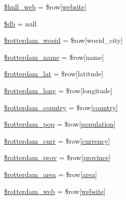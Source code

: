 \begin{DoxyCompactItemize}
\mbox{\hyperlink{index_8php_a5acbf72a3c5ccb817baae0bbb0daf2c8}{\$hull\+\_\+web}} = \$row\mbox{[}\textquotesingle{}\mbox{\hyperlink{index_8php_a8c56014cff17c1ced653aa98455da680}{website}}\textquotesingle{}\mbox{]}
\item 
\mbox{\hyperlink{index_8php_a1fa3127fc82f96b1436d871ef02be319}{\$db}} = null
\item 
\mbox{\hyperlink{index_8php_a7ff0c47a623b98fd9f9e0dee5abbefcd}{\$rotterdam\+\_\+woeid}} = \$row\mbox{[}\textquotesingle{}woeid\+\_\+city\textquotesingle{}\mbox{]}
\item 
\mbox{\hyperlink{index_8php_a0780d98281b29a8000a31c4df7de97a5}{\$rotterdam\+\_\+name}} = \$row\mbox{[}\textquotesingle{}name\textquotesingle{}\mbox{]}
\item 
\mbox{\hyperlink{index_8php_a8b6b05e0c62675c3c8477cb3128d546c}{\$rotterdam\+\_\+lat}} = \$row\mbox{[}\textquotesingle{}latitude\textquotesingle{}\mbox{]}
\item 
\mbox{\hyperlink{index_8php_a5a22865a4d2173cb8eb524d226a98331}{\$rotterdam\+\_\+long}} = \$row\mbox{[}\textquotesingle{}longitude\textquotesingle{}\mbox{]}
\item 
\mbox{\hyperlink{index_8php_a14facdd37996bc41b1e5db7e1dc56f94}{\$rotterdam\+\_\+country}} = \$row\mbox{[}\textquotesingle{}\mbox{\hyperlink{index_8php_a0f0752705301c982dc8994ebc993e6e9}{country}}\textquotesingle{}\mbox{]}
\item 
\mbox{\hyperlink{index_8php_a2a52e2eb9ee3b164cd210abb0cce25a7}{\$rotterdam\+\_\+pop}} = \$row\mbox{[}\textquotesingle{}\mbox{\hyperlink{index_8php_aa78fa356925cd3f67d485c4d6846202b}{population}}\textquotesingle{}\mbox{]}
\item 
\mbox{\hyperlink{index_8php_a34d2fd40789c8407df48306bcd61a785}{\$rotterdam\+\_\+curr}} = \$row\mbox{[}\textquotesingle{}\mbox{\hyperlink{index_8php_abd84e0698c321abdbf211d5b8425d0b5}{currency}}\textquotesingle{}\mbox{]}
\item 
\mbox{\hyperlink{index_8php_abc96df293e0693d8819f0d9f9b239dfe}{\$rotterdam\+\_\+prov}} = \$row\mbox{[}\textquotesingle{}\mbox{\hyperlink{index_8php_a38d70414c65575df5643ad4296c9db2e}{province}}\textquotesingle{}\mbox{]}
\item 
\mbox{\hyperlink{index_8php_a9322b687154ace187cdafd89421852c4}{\$rotterdam\+\_\+area}} = \$row\mbox{[}\textquotesingle{}\mbox{\hyperlink{index_8php_a5198216176428aa2303311f956213f33}{area}}\textquotesingle{}\mbox{]}
\item 
\mbox{\hyperlink{index_8php_a1590932cbcc34b305f9b67f5cf5fce87}{\$rotterdam\+\_\+web}} = \$row\mbox{[}\textquotesingle{}\mbox{\hyperlink{index_8php_a8c56014cff17c1ced653aa98455da680}{website}}\textquotesingle{}\mbox{]}

\end{DoxyCompactItemize}
